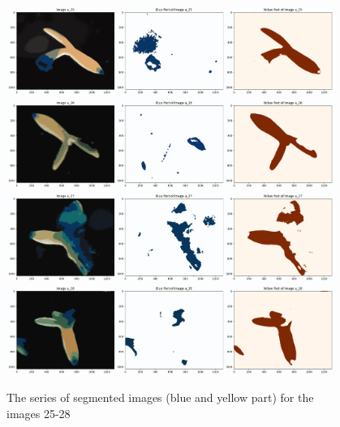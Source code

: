\documentclass{article}
\begin{document}
\begin{figure}[h!]
\centering
\includegraphics[width=0.95\textwidth]{Report/Images/Appendix Images/ColorSegments/Image25.png}
\includegraphics[width=0.95\textwidth]{Report/Images/Appendix Images/ColorSegments/Image26.png}
\includegraphics[width=0.95\textwidth]{Report/Images/Appendix Images/ColorSegments/Image27.png}
\includegraphics[width=0.95\textwidth]{Report/Images/Appendix Images/ColorSegments/Image28.png}
\caption{The series of segmented images (blue and yellow part) for the images 25-28} 
\label{fig:segment25-28}
\end{figure}
\end{document}
